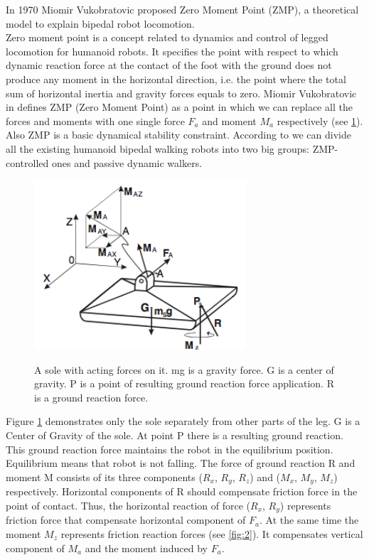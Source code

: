 \documentclass[12pt,a4paper]{report}
\begin{document}
		In 1970 Miomir Vukobratovic proposed Zero Moment Point (ZMP), a theoretical model to explain bipedal robot locomotion.\\
		Zero moment point is a concept related to dynamics and control of legged locomotion for humanoid robots. It specifies the point with respect to which dynamic reaction force at the contact of the foot with the ground does not produce any moment in the horizontal direction, i.e. the point where the total sum of horizontal inertia and gravity forces equals to zero.
		Miomir Vukobratovic in \cite{vukobratovic2004zero} defines ZMP (Zero Moment Point) as a point in which we can replace all the forces and moments with one single force $F_a$ and moment $M_a$ respectively  (see \cref{fig:1}). Also ZMP is a basic dynamical stability constraint.	According to \cite{manchester2011stable} we can divide all the existing humanoid bipedal walking robots into two big groups: ZMP-controlled ones and passive dynamic walkers.
	
		\begin{figure}[H]
			\vspace{-0.2cm}
			\centering
			{\includegraphics[width=0.7\textwidth]{1}}
			\caption{A sole with acting forces on it. mg is a gravity force. G is a center of gravity. P is a point of resulting ground reaction force application. R is a ground reaction force.}
			\label{fig:1}
			\vspace{-0.1cm}
		\end{figure}

		Figure \ref{fig:1} demonstrates only the sole separately from other parts of the leg. G is a Center of Gravity of the sole. At point P there is a resulting ground reaction. This ground reaction force maintains the robot in the equilibrium position. Equilibrium means that robot is not falling. The force of ground reaction R and moment M consists of its three components ($R_x$, $R_y$, $R_z$) and ($M_x$, $M_y$, $M_z$) respectively. Horizontal components of R should compensate friction force in the point of contact. Thus, the horizontal reaction of force ($R_x$, $R_y$) represents 
		friction force that compensate horizontal component of $F_a$. At the same time the moment $M_z$ represents friction reaction forces (see \cref{fig:2}).  It compensates vertical component of $M_a$ and the moment induced by $F_a$. \cite{vukobratovic2004zero}
\end{document}
